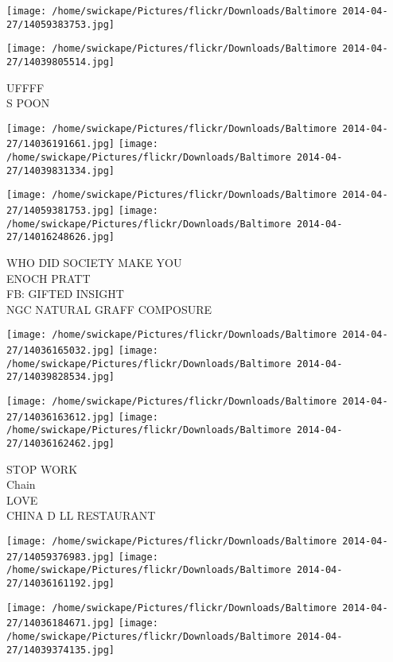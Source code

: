 \documentclass[10pt,letterpaper]{article}
\begin{document}
\texttt{[image: /home/swickape/Pictures/flickr/Downloads/Baltimore 2014-04-27/14059383753.jpg]}

\vspace{0.25in}
\texttt{[image: /home/swickape/Pictures/flickr/Downloads/Baltimore 2014-04-27/14039805514.jpg]}

UFFFF\\
S POON\\
\pagebreak

\texttt{[image: /home/swickape/Pictures/flickr/Downloads/Baltimore 2014-04-27/14036191661.jpg]}
\texttt{[image: /home/swickape/Pictures/flickr/Downloads/Baltimore 2014-04-27/14039831334.jpg]}

\texttt{[image: /home/swickape/Pictures/flickr/Downloads/Baltimore 2014-04-27/14059381753.jpg]}
\texttt{[image: /home/swickape/Pictures/flickr/Downloads/Baltimore 2014-04-27/14016248626.jpg]}

WHO DID SOCIETY MAKE YOU\\
ENOCH PRATT\\
FB: GIFTED INSIGHT\\
NGC NATURAL GRAFF COMPOSURE\\
\pagebreak

\texttt{[image: /home/swickape/Pictures/flickr/Downloads/Baltimore 2014-04-27/14036165032.jpg]}
\texttt{[image: /home/swickape/Pictures/flickr/Downloads/Baltimore 2014-04-27/14039828534.jpg]}

\texttt{[image: /home/swickape/Pictures/flickr/Downloads/Baltimore 2014-04-27/14036163612.jpg]}
\texttt{[image: /home/swickape/Pictures/flickr/Downloads/Baltimore 2014-04-27/14036162462.jpg]}

STOP WORK\\
Chain\\
LOVE\\
CHINA D LL RESTAURANT\\
\pagebreak

\texttt{[image: /home/swickape/Pictures/flickr/Downloads/Baltimore 2014-04-27/14059376983.jpg]}
\texttt{[image: /home/swickape/Pictures/flickr/Downloads/Baltimore 2014-04-27/14036161192.jpg]}

\texttt{[image: /home/swickape/Pictures/flickr/Downloads/Baltimore 2014-04-27/14036184671.jpg]}
\texttt{[image: /home/swickape/Pictures/flickr/Downloads/Baltimore 2014-04-27/14039374135.jpg]}
\end{document}
